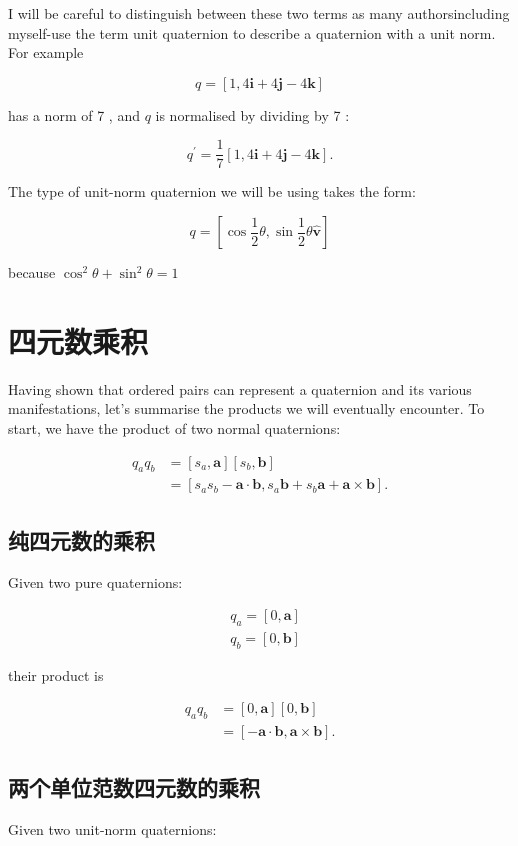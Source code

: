 I will be careful to distinguish between these two terms as many authorsincluding myself-use the term unit quaternion to describe a quaternion with a unit norm. For example

$$
q=[1,4 \mathbf{i}+4 \mathbf{j}-4 \mathbf{k}]
$$

has a norm of 7 , and $q$ is normalised by dividing by 7 :

$$
q^{\prime}=\frac{1}{7}[1,4 \mathbf{i}+4 \mathbf{j}-4 \mathbf{k}] .
$$

The type of unit-norm quaternion we will be using takes the form:

$$
q=\left[\cos \frac{1}{2} \theta, \sin \frac{1}{2} \theta \hat{\mathbf{v}}\right]
$$

because $\cos ^{2} \theta+\sin ^{2} \theta=1$

\section{四元数乘积}
Having shown that ordered pairs can represent a quaternion and its various manifestations, let's summarise the products we will eventually encounter. To start, we have the product of two normal quaternions:

$$
\begin{aligned}
q_{a} q_{b} & =\left[s_{a}, \mathbf{a}\right]\left[s_{b}, \mathbf{b}\right] \\
& =\left[s_{a} s_{b}-\mathbf{a} \cdot \mathbf{b}, s_{a} \mathbf{b}+s_{b} \mathbf{a}+\mathbf{a} \times \mathbf{b}\right] .
\end{aligned}
$$

\subsection{纯四元数的乘积}
Given two pure quaternions:

$$
\begin{aligned}
& q_{a}=[0, \mathbf{a}] \\
& q_{b}=[0, \mathbf{b}]
\end{aligned}
$$

their product is

$$
\begin{aligned}
q_{a} q_{b} & =[0, \mathbf{a}][0, \mathbf{b}] \\
& =[-\mathbf{a} \cdot \mathbf{b}, \mathbf{a} \times \mathbf{b}] .
\end{aligned}
$$

\subsection{两个单位范数四元数的乘积}
Given two unit-norm quaternions:

